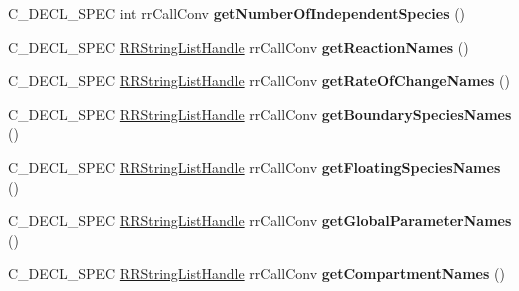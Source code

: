 \begin{DoxyCompactItemize}
\item 
\hypertarget{group__loadsave_ga29811c87b0f144e506c93373418fbe8b}{
\-C\-\_\-\-D\-E\-C\-L\-\_\-\-S\-P\-E\-C int rr\-Call\-Conv {\bfseries get\-Number\-Of\-Independent\-Species} ()}
\label{group__loadsave_ga29811c87b0f144e506c93373418fbe8b}

\item 
\hypertarget{group__loadsave_gafe6030585929ca78c5ce6d3944b11a1a}{
\-C\-\_\-\-D\-E\-C\-L\-\_\-\-S\-P\-E\-C \hyperlink{rr__c__types_8h_abf561b014879247b7b92ee99c205de21}{\-R\-R\-String\-List\-Handle} \*
rr\-Call\-Conv {\bfseries get\-Reaction\-Names} ()}
\label{group__loadsave_gafe6030585929ca78c5ce6d3944b11a1a}

\item 
\hypertarget{group__loadsave_ga1b676408037364f621f5bcb49a0f1474}{
\-C\-\_\-\-D\-E\-C\-L\-\_\-\-S\-P\-E\-C \hyperlink{rr__c__types_8h_abf561b014879247b7b92ee99c205de21}{\-R\-R\-String\-List\-Handle} \*
rr\-Call\-Conv {\bfseries get\-Rate\-Of\-Change\-Names} ()}
\label{group__loadsave_ga1b676408037364f621f5bcb49a0f1474}

\item 
\hypertarget{group__loadsave_gac0cfb68966bfb2656477f643a7f6494d}{
\-C\-\_\-\-D\-E\-C\-L\-\_\-\-S\-P\-E\-C \hyperlink{rr__c__types_8h_abf561b014879247b7b92ee99c205de21}{\-R\-R\-String\-List\-Handle} \*
rr\-Call\-Conv {\bfseries get\-Boundary\-Species\-Names} ()}
\label{group__loadsave_gac0cfb68966bfb2656477f643a7f6494d}

\item 
\hypertarget{group__loadsave_ga468d9d0cc8489ae85f4fd78d9fab343e}{
\-C\-\_\-\-D\-E\-C\-L\-\_\-\-S\-P\-E\-C \hyperlink{rr__c__types_8h_abf561b014879247b7b92ee99c205de21}{\-R\-R\-String\-List\-Handle} \*
rr\-Call\-Conv {\bfseries get\-Floating\-Species\-Names} ()}
\label{group__loadsave_ga468d9d0cc8489ae85f4fd78d9fab343e}

\item 
\hypertarget{group__loadsave_gabb7dd0b1f55a9f1c5ded728aa202027e}{
\-C\-\_\-\-D\-E\-C\-L\-\_\-\-S\-P\-E\-C \hyperlink{rr__c__types_8h_abf561b014879247b7b92ee99c205de21}{\-R\-R\-String\-List\-Handle} \*
rr\-Call\-Conv {\bfseries get\-Global\-Parameter\-Names} ()}
\label{group__loadsave_gabb7dd0b1f55a9f1c5ded728aa202027e}

\item 
\hypertarget{group__loadsave_gafe31d3b684c51fb829c1770898bc1e5d}{
\-C\-\_\-\-D\-E\-C\-L\-\_\-\-S\-P\-E\-C \hyperlink{rr__c__types_8h_abf561b014879247b7b92ee99c205de21}{\-R\-R\-String\-List\-Handle} \*
rr\-Call\-Conv {\bfseries get\-Compartment\-Names} ()}
\label{group__loadsave_gafe31d3b684c51fb829c1770898bc1e5d}


\end{DoxyCompactItemize}
